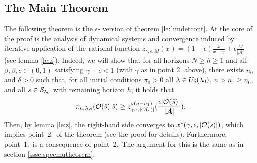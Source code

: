 \subsection{The Main Theorem}
The following theorem is the $\epsilon$-\eUDRL{} version of theorem \ref{le:limdetcont}.
\elimdetcont*
At the core of the proof is the analysis of dynamical systems and convergence
induced by iterative application of the rational function $z_{\gamma,\epsilon,M}(x) = (1-\epsilon)\frac{x}{x+\gamma} +\epsilon\frac{M}{|\mathcal{A}|}$ (see lemma \ref{le:z}). Indeed, we will show that for all horizons $N \geq h \geq 1$ and all $\beta,\tilde{\beta},\epsilon \in (0,1)$ satisfying $\gamma+\epsilon<1$ (with $\gamma$ as in point 2. above), 
there exists $n_0$ and $\delta >0$ such that, for all initial conditions
$\pi_0>0$
all $\mathit{\lambda} \in U_{\delta}(\mathit{\lambda}_0)$, $n>n_1\geq n_0$,
and all $\bar{s}\in\bar{\mathcal{S}}_{\mathit{\lambda}_0}$ with remaining horizon $h$, it holds that
\begin{equation}
\pi_{n,\mathit{\lambda},\epsilon}(\mathcal{O}(\bar{s})|\bar{s}) \geq
z_{\gamma,\epsilon,|\mathcal{O}(\bar{s})|}^{\circ (n-n_1)} (\frac{\epsilon|\mathcal{O}(\bar{s})|}{|\mathcal{A}|})
.
\label{eq:eforMainTheorem}
\end{equation}
Then, by lemma \ref{le:z}, the right-hand side converges to $x^*(\gamma,\epsilon,|\mathcal{O}(\bar{s})|)$, which implies point~2.\ of the theorem (see the proof for details). Furthermore, point~1.\ is a consequence of point~2.\ The argument for this is the same as in section \ref{ssse:specmutheorem}.
